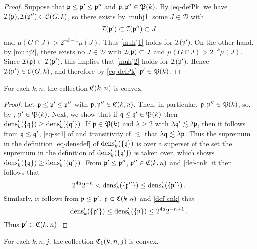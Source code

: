 \begin{proof}
    \leanok
    Suppose that ${\mathfrak p} \le {\mathfrak p}' \le {\mathfrak p}''$ and ${\mathfrak p}, {\mathfrak p}'' \in {\mathfrak P}(k)$. By \eqref{eq-defPk} we have ${\mathcal{I}}({\mathfrak p}), {\mathcal{I}}({\mathfrak p}'') \in \mathcal{C}(G,k)$, so there exists by \eqref{muhj1} some $J \in \mathcal{D}$ with
    $$
        {\mathcal{I}}({\mathfrak p}') \subset {\mathcal{I}}({\mathfrak p}'') \subset J
    $$
    and $\mu(G \cap J) > 2^{-k-1} \mu(J)$. Thus \eqref{muhj1} holds for ${\mathcal{I}}({\mathfrak p}')$. On the other hand, by \eqref{muhj2}, there exists no $J \in \mathcal{D}$ with ${\mathcal{I}}({\mathfrak p}) \subset J$ and $\mu(G \cap J) > 2^{-k} \mu(J)$. Since ${\mathcal{I}}({\mathfrak p}) \subset {\mathcal{I}}({\mathfrak p}')$, this implies that \eqref{muhj2} holds for ${\mathcal{I}}({\mathfrak p}')$. Hence ${\mathcal{I}}({\mathfrak p}') \in \mathcal{C}(G,k)$, and therefore by \eqref{eq-defPk} ${\mathfrak p}' \in {\mathfrak P}(k)$.
\end{proof}

\begin{lemma}[C convex]
    \label{C-convex}
    \leanok
    For each $k,n$, the collection ${\mathfrak C}(k,n)$ is convex.
\end{lemma}

\begin{proof}
    \leanok
    Let ${\mathfrak p} \le {\mathfrak p}' \le {\mathfrak p}''$ with ${\mathfrak p}, {\mathfrak p}'' \in {\mathfrak C}(k,n)$. Then, in particular, ${\mathfrak p}, {\mathfrak p}'' \in {\mathfrak P}(k)$, so, by , ${\mathfrak p}' \in {\mathfrak P}(k)$. Next, we show that if ${\mathfrak q} \le {\mathfrak q}' \in {\mathfrak P}(k)$ then $\operatorname{\operatorname{dens}}'_k(\{{\mathfrak q}\}) \ge \operatorname{\operatorname{dens}}_k'(\{{\mathfrak q}'\})$. If ${\mathfrak p} \in {\mathfrak P}(k)$ and $\lambda \ge 2$ with $\lambda {\mathfrak q}' \lesssim \lambda {\mathfrak p}$, then it follows from ${\mathfrak q} \le {\mathfrak q}'$, \eqref{eq-sc1} of  and transitivity of $\lesssim$ that $\lambda {\mathfrak q} \lesssim \lambda {\mathfrak p}$. Thus the supremum in the definition \eqref{eq-densdef} of $\operatorname{\operatorname{dens}}_k'(\{{\mathfrak q}\})$ is over a superset of the set the supremum in the definition of $\operatorname{\operatorname{dens}}_k'(\{{\mathfrak q}'\})$ is taken over, which shows $\operatorname{\operatorname{dens}}'_k(\{{\mathfrak q}\}) \ge \operatorname{\operatorname{dens}}_k'(\{{\mathfrak q}'\})$. From ${\mathfrak p}' \le {\mathfrak p}''$, ${\mathfrak p}'' \in {\mathfrak C}(k,n)$ and \eqref{def-cnk} it then follows that
    $$
        2^{4a}2^{-n} < \operatorname{\operatorname{dens}}_k'(\{{\mathfrak p}''\}) \le \operatorname{\operatorname{dens}}_k'(\{{\mathfrak p}'\})\,.
    $$
    Similarly, it follows from ${\mathfrak p} \le {\mathfrak p}'$, ${\mathfrak p} \in {\mathfrak C}(k,n)$ and \eqref{def-cnk} that
    $$
        \operatorname{\operatorname{dens}}_k'(\{{\mathfrak p}'\}) \le \operatorname{\operatorname{dens}}_k'(\{{\mathfrak p}\}) \le 2^{4a}2^{-n+1}\,.
    $$
    Thus ${\mathfrak p}' \in {\mathfrak C}(k,n)$.
\end{proof}

\begin{lemma}[C1 convex]
    \label{C1-convex}
    \leanok
    For each $k,n,j$, the collection ${\mathfrak C}_1(k,n,j)$ is convex.
\end{lemma}

